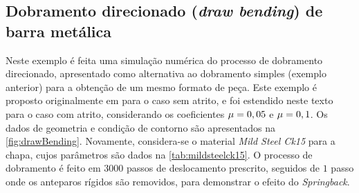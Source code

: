 \documentclass[Tese.tex]{subfiles}
\begin{document}
\subsection{Dobramento direcionado (\emph{draw bending}) de barra metálica}\label{subsec:draw-bending}

Neste exemplo é feita uma simulação numérica do processo de dobramento direcionado, apresentado como alternativa ao dobramento simples (exemplo anterior) para a obtenção de um mesmo formato de peça. Este exemplo é proposto originalmente em  para o caso sem atrito, e foi estendido neste texto para o caso com atrito, considerando os coeficientes $\mu = 0,05$ e $\mu = 0,1$. Os dados de geometria e condição de contorno são apresentados na \autoref{fig:drawBending}. Novamente, considera-se o material \emph{Mild Steel Ck15} para a chapa, cujos parâmetros são dados na \autoref{tab:mildsteelck15}. O processo de dobramento é feito em $3000$ passos de deslocamento prescrito, seguidos de $1$ passo onde os anteparos rígidos são removidos, para demonstrar o efeito do \emph{Springback}.
\end{document}
